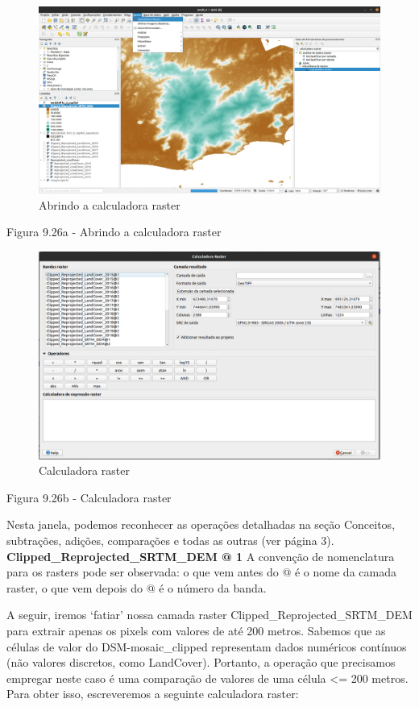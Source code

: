 \documentclass[
]{krantz}
\begin{document}
\begin{figure}
\centering
\includegraphics{media/modulo9/fig926_a.png}
\caption{Abrindo a calculadora raster}
\end{figure}

Figura 9.26a - Abrindo a calculadora raster

\begin{figure}
\centering
\includegraphics{media/modulo9/fig926_b.png}
\caption{Calculadora raster}
\end{figure}

Figura 9.26b - Calculadora raster

Nesta janela, podemos reconhecer as operações detalhadas na seção Conceitos, subtrações, adições, comparações e todas as outras (ver página 3). \textbf{Clipped\_Reprojected\_SRTM\_DEM @ 1} A convenção de nomenclatura para os rasters pode ser observada: o que vem antes do @ é o nome da camada raster, o que vem depois do @ é o número da banda.

A seguir, iremos `fatiar' nossa camada raster Clipped\_Reprojected\_SRTM\_DEM para extrair apenas os pixels com valores de até 200 metros. Sabemos que as células de valor do DSM-mosaic\_clipped representam dados numéricos contínuos (não valores discretos, como LandCover). Portanto, a operação que precisamos empregar neste caso é uma comparação de valores de uma célula \textless= 200 metros. Para obter isso, escreveremos a seguinte calculadora raster:
\end{document}
